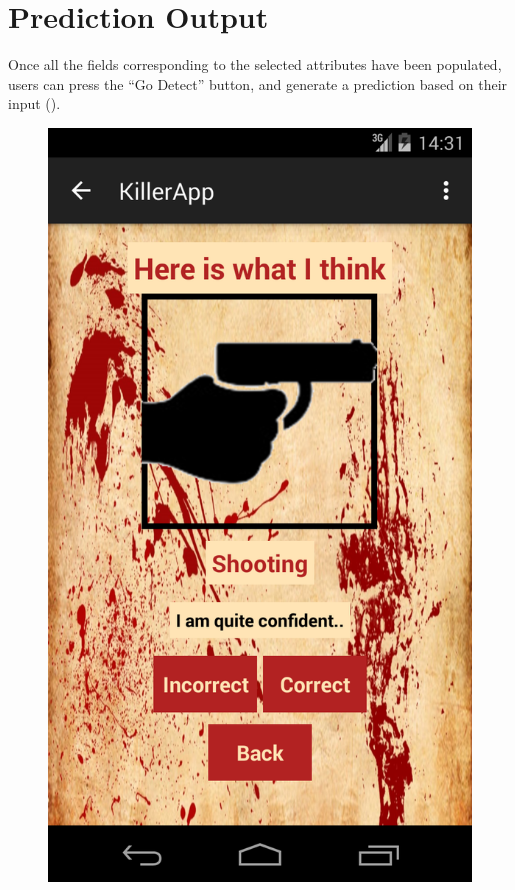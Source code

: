 \documentclass{mproj}
\begin{document}
\section{Prediction Output}

Once all the fields corresponding to the selected attributes have been populated, users can press the ``Go Detect'' button, and generate a prediction based on their input (). 

\begin{figure}[h]
	\centering
		\includegraphics[width=\linewidth]{images/prediction_screen}

\end{figure}
\end{document}

